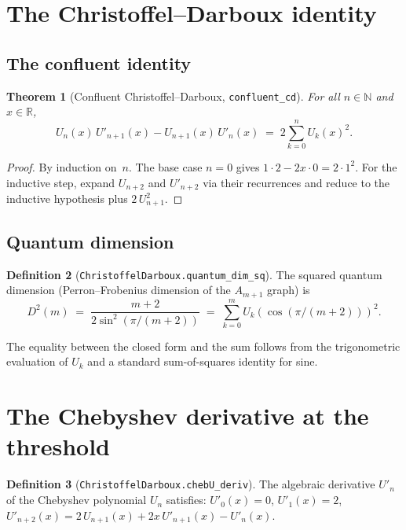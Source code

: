 \documentclass[11pt,a4paper]{article}
\theoremstyle{plain}
\newtheorem{theorem}{Theorem}[section]
\theoremstyle{definition}
\newtheorem{definition}[theorem]{Definition}
\newcommand{\N}{\mathbb{N}}
\newcommand{\R}{\mathbb{R}}
\newcommand{\Dsq}{D^2}
\newcommand{\chebU}{U}
\newcommand{\lean}[1]{\texttt{#1}}
\begin{document}
\section{The Christoffel--Darboux identity}
\label{sec:cd}

\subsection{The confluent identity}

\begin{theorem}[Confluent Christoffel--Darboux, \lean{confluent\_cd}]
\label{thm:confluent-cd}
For all $n \in \N$ and $x \in \R$,
\[
  \chebU_n(x)\,\chebU'_{n+1}(x) - \chebU_{n+1}(x)\,\chebU'_n(x)
  \;=\; 2\sum_{k=0}^{n} \chebU_k(x)^2.
\]
\end{theorem}

\begin{proof}
By induction on~$n$.  The base case $n=0$ gives $1 \cdot 2 - 2x \cdot 0 = 2 \cdot 1^2$.
For the inductive step, expand $\chebU_{n+2}$ and $\chebU'_{n+2}$ via
their recurrences and reduce to the inductive hypothesis plus $2\,\chebU_{n+1}^2$.
\end{proof}

\subsection{Quantum dimension}

\begin{definition}[\lean{ChristoffelDarboux.quantum\_dim\_sq}]
The squared quantum dimension (Perron--Frobenius dimension
of the $A_{m+1}$ graph) is
\[
  \Dsq(m) \;=\; \frac{m+2}{2\sin^2(\pi/(m{+}2))}
  \;=\; \sum_{k=0}^{m} \chebU_k(\cos(\pi/(m{+}2)))^2.
\]
\end{definition}

The equality between the closed form and the sum follows from the
trigonometric evaluation of $\chebU_k$ and a standard sum-of-squares
identity for sine.

\section{The Chebyshev derivative at the threshold}
\label{sec:deriv}

\begin{definition}[\lean{ChristoffelDarboux.chebU\_deriv}]
The algebraic derivative $\chebU'_n$ of the Chebyshev polynomial
$\chebU_n$ satisfies:
$\chebU'_0(x)=0$, $\chebU'_1(x)=2$,
$\chebU'_{n+2}(x) = 2\,\chebU_{n+1}(x) + 2x\,\chebU'_{n+1}(x) - \chebU'_n(x)$.
\end{definition}
\end{document}
